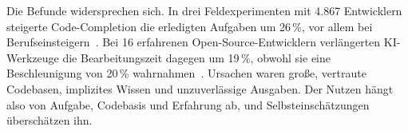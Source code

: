 Die Befunde widersprechen sich. In drei Feldexperimenten mit 4.867 Entwicklern steigerte Code-Completion die erledigten Aufgaben um 26\,\%, vor allem bei Berufseinsteigern~\cite{cui2025genai}. Bei 16 erfahrenen Open-Source-Entwicklern verlängerten KI-Werkzeuge die Bearbeitungszeit dagegen um 19\,\%, obwohl sie eine Beschleunigung von 20\,\% wahrnahmen~\cite{becker2025metr}. Ursachen waren große, vertraute Codebasen, implizites Wissen und unzuverlässige Ausgaben. Der Nutzen hängt also von Aufgabe, Codebasis und Erfahrung ab, und Selbsteinschätzungen überschätzen ihn.
